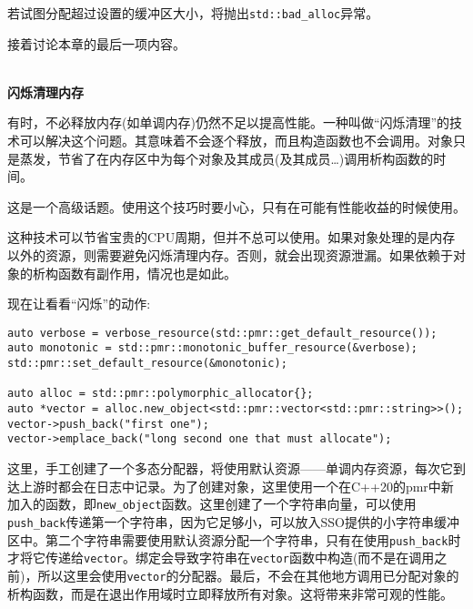 若试图分配超过设置的缓冲区大小，将抛出\texttt{std::bad\_alloc}异常。

接着讨论本章的最后一项内容。

\hspace*{\fill} \\ %
\noindent
\textbf{闪烁清理内存}

有时，不必释放内存(如单调内存)仍然不足以提高性能。一种叫做“闪烁清理”的技术可以解决这个问题。其意味着不会逐个释放，而且构造函数也不会调用。对象只是蒸发，节省了在内存区中为每个对象及其成员(及其成员…)调用析构函数的时间。

\begin{tcolorbox}[colback=blue!5!white,colframe=blue!75!black, title=Note]
\hspace*{0.75cm}这是一个高级话题。使用这个技巧时要小心，只有在可能有性能收益的时候使用。
\end{tcolorbox}

这种技术可以节省宝贵的CPU周期，但并不总可以使用。如果对象处理的是内存以外的资源，则需要避免闪烁清理内存。否则，就会出现资源泄漏。如果依赖于对象的析构函数有副作用，情况也是如此。

现在让看看“闪烁”的动作:

\begin{lstlisting}[style=styleCXX]
auto verbose = verbose_resource(std::pmr::get_default_resource());
auto monotonic = std::pmr::monotonic_buffer_resource(&verbose);
std::pmr::set_default_resource(&monotonic);

auto alloc = std::pmr::polymorphic_allocator{};
auto *vector = alloc.new_object<std::pmr::vector<std::pmr::string>>();
vector->push_back("first one");
vector->emplace_back("long second one that must allocate");
\end{lstlisting}

这里，手工创建了一个多态分配器，将使用默认资源——单调内存资源，每次它到达上游时都会在日志中记录。为了创建对象，这里使用一个在C++20的pmr中新加入的函数，即\texttt{new\_object}函数。这里创建了一个字符串向量，可以使用\texttt{push\_back}传递第一个字符串，因为它足够小，可以放入SSO提供的小字符串缓冲区中。第二个字符串需要使用默认资源分配一个字符串，只有在使用\texttt{push\_back}时才将它传递给\texttt{vector}。绑定会导致字符串在\texttt{vector}函数中构造(而不是在调用之前)，所以这里会使用\texttt{vector}的分配器。最后，不会在其他地方调用已分配对象的析构函数，而是在退出作用域时立即释放所有对象。这将带来非常可观的性能。















 